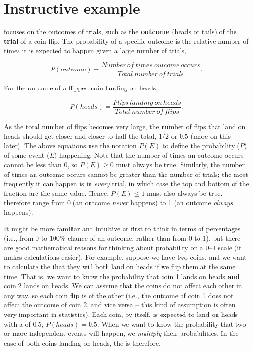\documentclass[
  openany]{krantz}
\begin{document}
\hypertarget{instructive-example}{%
\section{Instructive example}\label{instructive-example}}

 focuses on the outcomes of trials, such as the \textbf{outcome} (heads or tails) of the \textbf{trial} of a coin flip.
The probability of a specific outcome is the relative number of times it is expected to happen given a large number of trials,

\[P(outcome) = \frac{Number\:of\:times\:outcome\:occurs}{Total\:number\:of\:trials}.\]

For the outcome of a flipped coin landing on heads,

\[P(heads) = \frac{Flips\:landing\:on\:heads}{Total\:number\:of\:flips}.\]

As the total number of flips becomes very large, the number of flips that land on heads should get closer and closer to half the total, \(1/2\) or \(0.5\) (more on this later).
The above equations use the notation \(P(E)\) to define the probability (\(P\)) of some event (\(E\)) happening.
Note that the number of times an outcome occurs cannot be less than 0, so \(P(E) \geq 0\) must always be true.
Similarly, the number of times an outcome occurs cannot be greater than the number of trials; the most frequently it can happen is in \emph{every} trial, in which case the top and bottom of the fraction are the same value.
Hence, \(P(E) \leq 1\) must also always be true.
 therefore range from 0 (an outcome \emph{never} happens) to 1 (an outcome \emph{always} happens).

It might be more familiar and intuitive at first to think in terms of percentages (i.e., from 0 to 100\% chance of an outcome, rather than from 0 to 1), but there are good mathematical reasons for thinking about probability on a 0--1 scale (it makes calculations easier).
For example, suppose we have two coins, and we want to calculate the  that they will both land on heads if we flip them at the same time.
That is, we want to know the probability that coin 1 lands on heads \textbf{and} coin 2 lands on heads.
We can assume that the coins do not affect each other in any way, so each coin flip is \textbf{} of the other (i.e., the outcome of coin 1 does not affect the outcome of coin 2, and vice versa -- this kind of assumption is often very important in statistics).
Each coin, by itself, is expected to land on heads with a  of 0.5, \(P(heads) = 0.5\).
When we want to know the probability that two or more independent events will happen, we \emph{multiply} their probabilities.
In the case of both coins landing on heads, the  is therefore,
\end{document}
